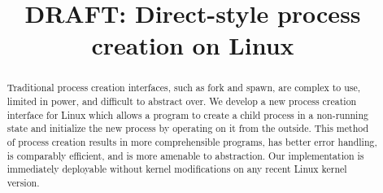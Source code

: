 \documentclass[letterpaper,twocolumn,10pt]{article}
\begin{document}
\newcommand{\twosigma}{{[tech company]}}
\newcommand{\githuburl}{[Github url]}
\date{}
\title{\Large \bf DRAFT: Direct-style process creation on Linux}
\maketitle
\begin{abstract}
Traditional process creation interfaces,
such as fork and spawn,
are complex to use, limited in power, and difficult to abstract over.
We develop a new process creation interface for Linux
which allows a program to create a child process in a non-running state
and initialize the new process by operating on it from the outside.
This method of process creation results in more comprehensible programs, 
has better error handling,
is comparably efficient,
and is more amenable to abstraction.
Our implementation is immediately deployable without kernel modifications on any recent Linux kernel version.
\end{abstract}
\end{document}
